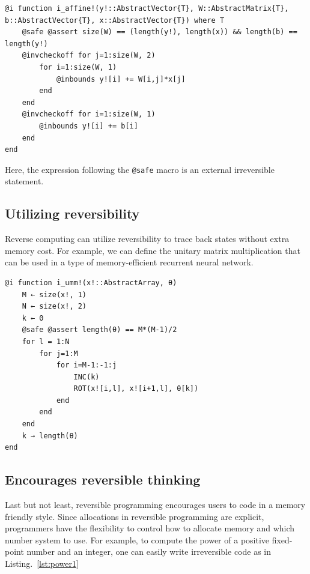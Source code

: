 \documentclass{article}
\newcommand{\<}{\langle}
\renewcommand{\>}{\rangle}
\renewcommand{\cite}[1]{{\citep{#1}}}
\newcommand{\Lst}[1]{Listing.~\ref{#1}}
\theoremstyle{definition}\newtheorem{definition}{\textit{Definition}}
\begin{document}
\begin{minipage}{.88\columnwidth}
\begin{lstlisting}[mathescape=true,caption={Inplace affine transformation.},label={lst:affine}]
@i function i_affine!(y!::AbstractVector{T}, W::AbstractMatrix{T}, b::AbstractVector{T}, x::AbstractVector{T}) where T
    @safe @assert size(W) == (length(y!), length(x)) && length(b) == length(y!)
    @invcheckoff for j=1:size(W, 2)
        for i=1:size(W, 1)
            @inbounds y![i] += W[i,j]*x[j]
        end
    end
    @invcheckoff for i=1:size(W, 1)
        @inbounds y![i] += b[i]
    end
end
\end{lstlisting}
\end{minipage}

Here, the expression following the \texttt{@safe} macro is an external irreversible statement.

\subsection{Utilizing reversibility}\label{app:reversibility}
Reverse computing can utilize reversibility to trace back states without extra memory cost.
For example, we can define the unitary matrix multiplication that can be used in a type of memory-efficient recurrent neural network.~\cite{Jing2016}

\begin{minipage}{.88\columnwidth}
\begin{lstlisting}[mathescape=true,caption={Two level decomposition of a unitary matrix.},label={lst:affine}]
@i function i_umm!(x!::AbstractArray, θ)
    M ← size(x!, 1)
    N ← size(x!, 2)
    k ← 0
    @safe @assert length(θ) == M*(M-1)/2
    for l = 1:N
        for j=1:M
            for i=M-1:-1:j
                INC(k)
                ROT(x![i,l], x![i+1,l], θ[k])
            end
        end
    end
    k → length(θ)
end
\end{lstlisting}
\end{minipage}

\subsection{Encourages reversible thinking}\label{app:chainedmul}
Last but not least, reversible programming encourages users to code in a memory friendly style.
Since allocations in reversible programming are explicit, programmers have the flexibility to control how to allocate memory and which number system to use.
For example, to compute the power of a positive fixed-point number and an integer, one can easily write irreversible code as in \Lst{lst:power1}
\end{document}
